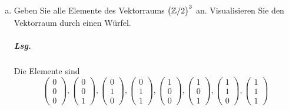 \documentclass{scrreprt}
\begin{document}
\begin{enumerate}[(a)]
\item Geben Sie alle Elemente des Vektorraums $\qty\big(\mathbb{Z}/2)^3$ an.
  Visualisieren Sie den Vektorraum durch einen Würfel.

  \subparagraph{Lsg.} Die Elemente sind
  \[
    \begin{pmatrix} 0 \\ 0 \\ 0 \end{pmatrix},
    \begin{pmatrix} 0 \\ 0 \\ 1 \end{pmatrix},
    \begin{pmatrix} 0 \\ 1 \\ 0 \end{pmatrix},
    \begin{pmatrix} 0 \\ 1 \\ 1 \end{pmatrix},
    \begin{pmatrix} 1 \\ 0 \\ 0 \end{pmatrix},
    \begin{pmatrix} 1 \\ 0 \\ 1 \end{pmatrix},
    \begin{pmatrix} 1 \\ 1 \\ 0 \end{pmatrix},
    \begin{pmatrix} 1 \\ 1 \\ 1 \end{pmatrix}
  \]


\end{enumerate}
\end{document}
